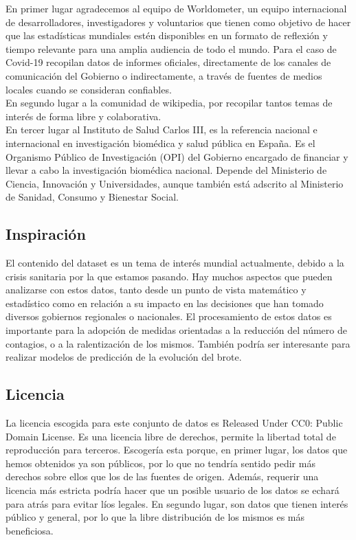 \documentclass[]{article}
\begin{document}
En primer lugar agradecemos al equipo de Worldometer, un equipo internacional de desarrolladores, investigadores y voluntarios que tienen como objetivo de hacer que las estadísticas mundiales estén disponibles en un formato de reflexión y tiempo relevante para una amplia audiencia de todo el mundo.
Para el caso de Covid-19 recopilan datos de informes oficiales, directamente de los canales de comunicación del Gobierno o indirectamente, a través de fuentes de medios locales cuando se consideran confiables.\\
En segundo lugar a la comunidad de wikipedia, por recopilar tantos temas de interés de forma libre y colaborativa.\\
En tercer lugar al Instituto de Salud Carlos III, es la referencia nacional e internacional en investigación biomédica y salud pública en España. Es el Organismo Público de Investigación (OPI) del Gobierno encargado de financiar y llevar a cabo la investigación biomédica nacional. Depende del Ministerio de Ciencia, Innovación y Universidades, aunque también está adscrito al Ministerio de Sanidad, Consumo y Bienestar Social.


\hypertarget{inspiracian}{%
\subsection{Inspiración}\label{inspiracian}}

El contenido del dataset es un tema de interés mundial actualmente, debido a la crisis sanitaria por la que estamos pasando. Hay muchos aspectos que pueden analizarse con estos datos, tanto desde un punto de vista matemático y estadístico como en relación a su impacto en las decisiones que han tomado diversos gobiernos regionales o nacionales. El procesamiento de estos datos es importante para la adopción de medidas orientadas a la reducción del número de contagios, o a la ralentización de los mismos. También podría ser interesante para realizar modelos de predicción de la evolución del brote.

\hypertarget{licencia}{%
\subsection{Licencia}\label{licencia}}

La licencia escogida para este conjunto de datos es Released Under CC0: Public Domain License.
Es una licencia libre de derechos, permite la libertad total de reproducción para terceros. Escogería esta porque, en primer lugar, los datos que hemos obtenidos ya son públicos, por lo que no tendría sentido pedir más derechos sobre ellos que los de las fuentes de origen. Además, requerir una licencia más estricta podría hacer que un posible usuario de los datos se echará para atrás para evitar líos legales. En segundo lugar, son datos que tienen interés público y general, por lo que la libre distribución de los mismos es más beneficiosa.
\end{document}
